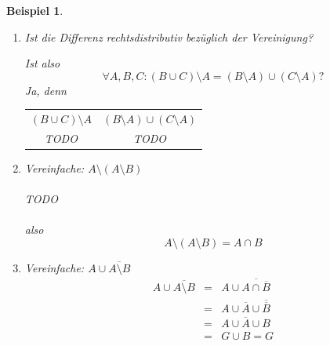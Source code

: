 \documentclass{report}
\newtheorem{myexample}{Beispiel}
\begin{document}
\begin{myexample}
\begin{enumerate}
\begin{enumerate}
und
\begin{eqnarray} (B \setminus A) \cap (C \setminus A) & = & B \cap \overline{A} \cap C \cap \overline{A}\\ \nonumber
& = & B \cap C \cap \overline{A} \cap \overline{A} \\ \nonumber
& = & B \cap C \cap \overline{A}\end{eqnarray}
\end{enumerate}
Also
\begin{equation}B \cap (C \setminus A) = (B \setminus A) \cap (C \setminus A)\end{equation}
Wir sagen, dass die Differenz \underline{rechtsdistributiv} bezüglich des Schnittes ist. Sie ist aber \underline{nicht linksdistributiv} des Schnittes.
\item Ist die Differenz rechtsdistributiv bezüglich der Vereinigung?

Ist also
\begin{equation}\forall A,B,C : (B \cup C) \setminus A = (B \setminus A) \cup (C \setminus A) \mbox{?}\end{equation}
Ja, denn
\begin{center}\begin{tabular}{c c}
$(B \cup C) \setminus A$ & $(B \setminus A) \cup (C \setminus A)$ \\
TODO & TODO\end{tabular}\end{center}%
\item Vereinfache: $A \setminus (A \setminus B)$
\\\\TODO\\\\%
also
\begin{equation}A \setminus (A \setminus B) = A \cap B\end{equation}
\item Vereinfache: $A \cup \overline{A \setminus B}$
\begin{eqnarray}A \cup \overline{A \setminus B} & = & A \cup \overline{A \cap \overline{B}}\\ \nonumber
& = & A \cup \overline{A} \cup \overline{\overline{B}} \\ \nonumber
& = & A \cup \overline{A} \cup B \\ \nonumber
& = & G \cup B = G\end{eqnarray}
\end{enumerate}\end{myexample}
\end{document}
